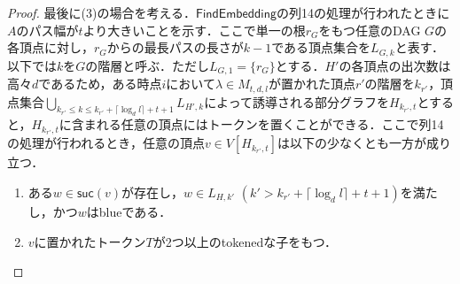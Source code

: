 \documentclass[master]{kuisthesis}		%
\theoremstyle{plain}
\theoremstyle{definition}
\begin{document}
\begin{proof}
最後に(3)の場合を考える．$\mathsf{FindEmbedding}$の列14の処理が行われたときに$A$のパス幅が$t$より大きいことを示す．ここで単一の根$r_G$をもつ任意のDAG $G$の各頂点に対し，$r_G$からの最長パスの長さが$k-1$である頂点集合を$L_{G, k}$と表す．以下では$k$を$G$の階層と呼ぶ．ただし$L_{G, 1} = \{r_G\}$とする．$H'$の各頂点の出次数は高々$d$であるため，ある時点$i$において$\lambda \in M_{t, d, l}$が置かれた頂点$r'$の階層を$k_{r'}$，頂点集合$\bigcup_{k_{r'} \leq k \leq k_{r'}+ \lceil \log_d l \rceil +t+1} L_{H', k}$によって誘導される部分グラフを$H_{k_{r'}, t}$とすると，$H_{k_{r'}, t}$に含まれる任意の頂点にはトークンを置くことができる．ここで列14の処理が行われるとき，任意の頂点$v \in V[H_{k_{r'}, t}]$は以下の少なくとも一方が成り立つ．

\begin{enumerate}
    \item ある$w \in \mathsf{suc}(v)$が存在し，$w \in L_{H, k'}$ $(k' > k_{r'}+ \lceil \log_d l \rceil +t+1)$を満たし，かつ$w$はblueである． \label{cond1}
    \item $v$に置かれたトークン$T$が2つ以上のtokenedな子をもつ． \label{cond2}
\end{enumerate}


\end{proof}
\end{document}
